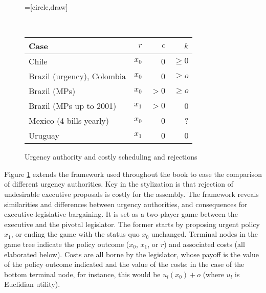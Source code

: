 \documentclass[letter,12pt]{article}
\begin{document}
\begin{figure}
  \centering
    =[circle,draw]
      \\
 \footnotesize{
 \begin{tabular}{lrrr}
  Case                       & $r$   & $c$   & $k$      \\ \hline
  Chile                      & $x_0$ & 0     & $\geq0$     \\
  Brazil (urgency), Colombia & $x_0$ & 0     & $\geq o$    \\
  Brazil (MPs)               & $x_0$ & $>0$  & $\geq o$    \\
  Brazil (MPs up to 2001)    & $x_1$ & $>0$  & 0        \\
  Mexico (4 bills yearly)    & $x_0$ & 0     & ?        \\
  Uruguay                    & $x_1$ & 0     & 0        \\
  \end{tabular}
  }
\caption{Urgency authority and costly scheduling and rejections}\label{f:costly}
\end{figure}

Figure \ref{f:costly} extends the framework used throughout the book to ease the comparison of different urgency authorities. Key in the stylization is that rejection of undesirable executive proposals is costly for the assembly. The framework reveals similarities and differences between urgency authorities, and consequences for executive-legislative bargaining. It is set as a two-player game between the executive and the pivotal legislator. The former starts by proposing urgent policy $x_1$, or ending the game with the status quo $x_0$ unchanged. Terminal nodes in the game tree indicate the policy outcome ($x_0$, $x_1$, or $r$) and associated costs (all elaborated below). Costs are all borne by the legislator, whose payoff is the value of the policy outcome indicated and the value of the costs: in the case of the bottom terminal node, for instance, this would be $u_l(x_0)+o$ (where $u_l$ is Euclidian utility). 
\end{document}
